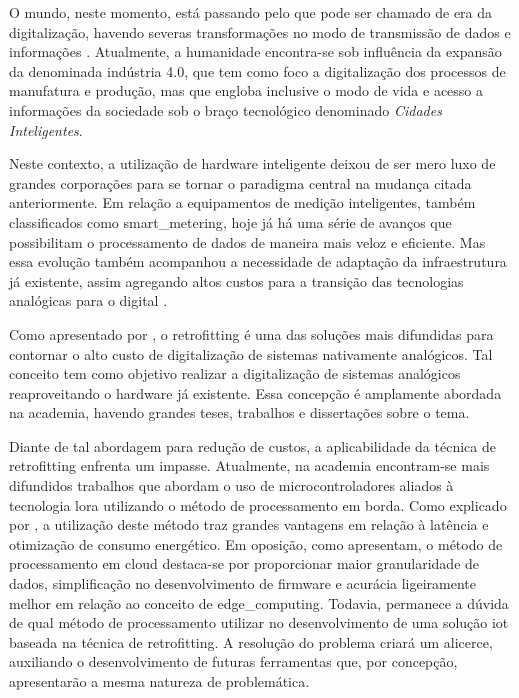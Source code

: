 O mundo, neste momento, está passando pelo que pode ser chamado de era da digitalização, 
havendo severas transformações no modo de transmissão de dados e informações \cite{Tedjojuwono2024}. 
Atualmente, a humanidade encontra-se sob influência da expansão da denominada indústria 4.0,
que tem como foco a digitalização dos processos de manufatura e produção, mas que engloba 
inclusive o modo de vida e acesso a informações da sociedade sob o braço 
tecnológico denominado \textit{Cidades Inteligentes}.

Neste contexto, a utilização de hardware inteligente deixou de ser mero luxo de grandes
corporações para se tornar o paradigma central na mudança citada anteriormente. Em relação a equipamentos de medição inteligentes,
também classificados como \gls{smart_metering}, hoje já há uma série de avanços que possibilitam o processamento 
de dados de maneira mais veloz e eficiente. Mas essa evolução também acompanhou a necessidade de adaptação da infraestrutura já existente, 
assim agregando altos custos para a transição das tecnologias analógicas para o digital \cite{Stefano2019}.

Como apresentado por , o \gls{retrofitting} é uma das soluções mais difundidas para contornar o 
alto custo de digitalização de sistemas nativamente analógicos. Tal conceito tem como objetivo realizar a digitalização 
de sistemas analógicos reaproveitando o hardware já existente. Essa concepção é amplamente abordada na academia, havendo grandes teses,
trabalhos e dissertações sobre o tema.

Diante de tal abordagem para redução de custos, a aplicabilidade da técnica de \gls{retrofitting} enfrenta um impasse.
Atualmente, na academia encontram-se mais difundidos trabalhos que abordam o uso de microcontroladores aliados à tecnologia \gls{lora}
utilizando o método de processamento em borda. Como explicado por , a utilização deste método 
traz grandes vantagens em relação à latência e otimização de consumo energético. Em oposição, como  apresentam,
o método de processamento em cloud destaca-se por proporcionar maior granularidade de dados, simplificação no desenvolvimento 
de firmware e acurácia ligeiramente melhor em relação ao conceito de \gls{edge_computing}. Todavia, permanece a dúvida de qual 
método de processamento utilizar no desenvolvimento de uma solução \gls{iot} baseada na técnica de \gls{retrofitting}. 
A resolução do problema criará um alicerce, auxiliando o desenvolvimento de futuras ferramentas que, por concepção, apresentarão a 
mesma natureza de problemática.
